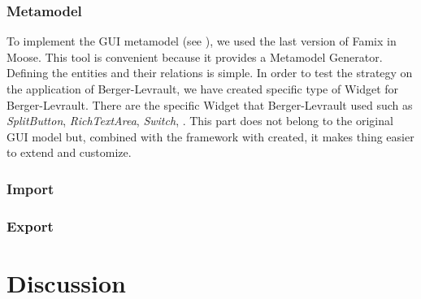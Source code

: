\documentclass[conference]{IEEEtran}
\begin{document}

    \subsubsection{Metamodel}
    \label{sec:metamodel}

    To implement the GUI metamodel (see ),
        we used the last version of Famix  in Moose.
    This tool is convenient because it provides a Metamodel Generator.
    Defining the entities and their relations is simple.
    In order to test the strategy on the application of Berger-Levrault,
        we have created specific type of Widget for Berger-Levrault.
    There are the specific Widget that Berger-Levrault used such as \textit{SplitButton}, \textit{RichTextArea}, \textit{Switch}, \etc.
    This part does not belong to the original GUI model but, 
        combined with the framework with created, it makes thing easier to extend and customize.

    \subsubsection{Import}
    \label{sec:import}

    \subsubsection{Export}
    \label{sec:export}

    
    
    \section{Discussion}
    \label{sec:discussion}
    
\end{document}
